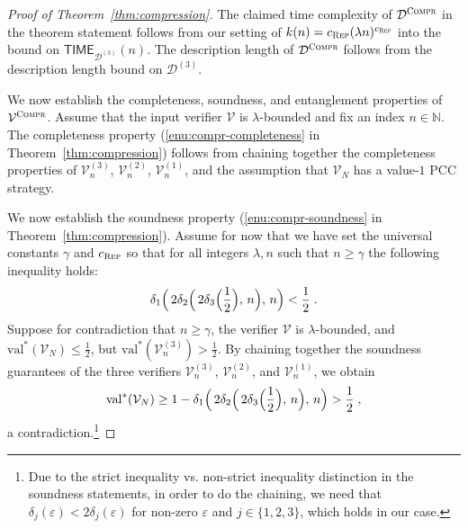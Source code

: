 \documentclass[11pt]{article}
\theoremstyle{definition}
\newcommand{\N}{\ensuremath{\mathbb{N}}}
\newcommand{\val}{\ensuremath{\mathrm{val}}}
\newcommand{\eps}{\varepsilon}
\newcommand{\decider}{\mathcal{D}}
\newcommand{\verifier}{\mathcal{V}}
\newcommand{\gamestyle}[1]{\ensuremath{\textsc{#1}}\xspace}
\newcommand{\compr}{\textsc{Compr}}
\newcommand{\TIME}{\mathsf{TIME}}
\newcommand{\rep}{\gamestyle{Rep}}
\begin{document}
\begin{proof}[Proof of Theorem~\ref{thm:compression}]
  The claimed time complexity of $\decider^\compr$ in the theorem statement
  follows from our setting of $k(n) = c_\rep (\lambda n)^{c_\rep}$ into the
  bound on $\TIME_{\decider^{(3)}}(n)$.
  The description length of $\decider^\compr$ follows from the description
  length bound on $\decider^{(3)}$.

  We now establish the completeness, soundness, and entanglement properties of
  $\verifier^\compr$.
  Assume that the input verifier $\verifier$ is $\lambda$-bounded and fix an
  index $n \in \N$.
  The completeness property (\cref{enu:compr-completeness} in
  Theorem~\ref{thm:compression}) follows from chaining together the completeness
  properties of $\verifier^{(3)}_n$, $\verifier^{(2)}_n$, $\verifier^{(1)}_n$,
  and the assumption that $\verifier_N$ has a value-$1$ PCC strategy.

  We now establish the soundness property (\cref{enu:compr-soundness} in
  Theorem~\ref{thm:compression}).
  Assume for now that we have set the universal constants $\gamma$ and $c_\rep$
  so that for all integers $\lambda,n$ such that $n \geq \gamma$ the following
  inequality holds:
  \begin{equation}
    \label{eq:delta-cascade}
    \delta_1 \Bigl(\, 2 \delta_2 \Bigl(\, 2 \delta_3 \Bigl( \frac{1}{2} \Bigr),\,
    n \Bigr),\, n \Bigr) < \frac{1}{2}\;.
  \end{equation}
  Suppose for contradiction that $n \geq \gamma$, the
  verifier $\verifier$ is $\lambda$-bounded, and $\val^*(\verifier_N) \leq
  \frac{1}{2}$, but $\val^*(\verifier^{(3)}_n) > \frac{1}{2}$.
  By chaining together the soundness guarantees of the three verifiers
  $\verifier^{(3)}_n$, $\verifier^{(2)}_n$, and $\verifier^{(1)}_n$, we obtain
  \[
    \val^*(\verifier_N) \geq 1 -
    \delta_1 \Bigl(\, 2 \delta_2 \Bigl(\, 2 \delta_3 \Bigl( \frac{1}{2} \Bigr),\,
    n \Bigr),\, n \Bigr) > \frac{1}{2}\;,
  \]
  a contradiction.\footnote{Due to the strict inequality vs.
    non-strict inequality distinction in the soundness statements, in order to
    do the chaining, we need that $\delta_j(\eps) < 2\delta_j(\eps)$ for
    non-zero $\eps$ and $j \in \{1,2,3\}$, which holds in our case.}


\end{proof}
\end{document}
